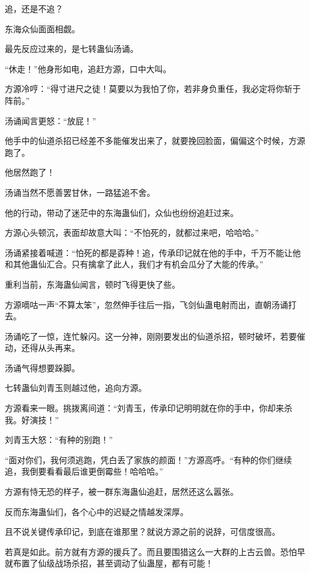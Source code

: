 
\begin{this_body}



追，还是不追？

东海众仙面面相觑。

最先反应过来的，是七转蛊仙汤诵。

“休走！”他身形如电，追赶方源，口中大叫。

方源冷哼：“得寸进尺之徒！莫要以为我怕了你，若非身负重任，我必定将你斩于阵前。”

汤诵闻言更怒：“放屁！”

他手中的仙道杀招已经差不多能催发出来了，就要挽回脸面，偏偏这个时候，方源跑了。

他居然跑了！

汤诵当然不愿善罢甘休，一路猛追不舍。

他的行动，带动了迷茫中的东海蛊仙们，众仙也纷纷追赶过来。

方源心头顿沉，表面却故意大叫：“不怕死的，就都过来吧，哈哈哈。”

汤诵紧接着喊道：“怕死的都是孬种！追，传承印记就在他的手中，千万不能让他和其他蛊仙汇合。只有擒拿了此人，我们才有机会瓜分了大能的传承。”

重利当前，东海蛊仙闻言，顿时飞得更快了些。

方源嘀咕一声“不算太笨”，忽然伸手往后一指，飞剑仙蛊电射而出，直朝汤诵打去。

汤诵吃了一惊，连忙躲闪。这一分神，刚刚要发出的仙道杀招，顿时破坏，若要催动，还得从头再来。

汤诵气得想要跺脚。

七转蛊仙刘青玉则越过他，追向方源。

方源看来一眼。挑拨离间道：“刘青玉，传承印记明明就在你的手中，你却来杀我。好演技！”

刘青玉大怒：“有种的别跑！”

“面对你们，我何须逃跑，凭白丢了家族的颜面！”方源高呼。“有种的你们继续追，我倒要看看最后谁更倒霉些！哈哈哈。”

方源有恃无恐的样子，被一群东海蛊仙追赶，居然还这么嚣张。

反而东海蛊仙们，各个心中的迟疑之情越发深厚。

且不说关键传承印记，到底在谁那里？就说方源之前的说辞，可信度很高。

若真是如此。前方就有方源的援兵了。而且要围猎这么一大群的上古云兽。恐怕早就布置了仙级战场杀招，甚至调动了仙蛊屋，都有可能！


\end{this_body}
